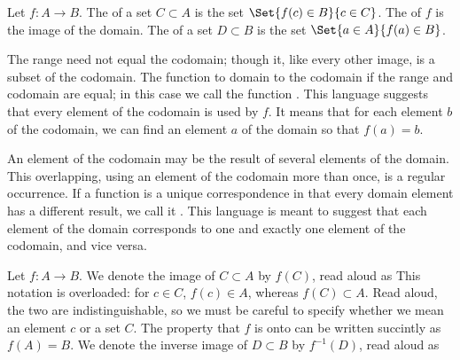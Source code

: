 Let $f: A \to B$.
The  of a set $C \subset A$
is the set $\Set{f(c) \in B}{c \in C}$.
The  of $f$ is the image
of the domain.
The  of a set
$D \subset B$ is the set $\Set{a \in A}{f(a) \in B}$.

The range need not equal the codomain; though it,
like every other image, is a subset of the codomain.
The function  to domain
 to the codomain if the
range and codomain are equal;
in this case we call the function .
This language suggests that every element of
the codomain is used by $f$.
It means that for each element $b$ of the codomain,
we can find an element $a$ of the domain so that
$f(a) = b$.

An element of the codomain may be the result
of several elements of the domain.
This overlapping, using an element of the
codomain more than once, is a regular occurrence.
If a function is a unique correspondence in that
every domain element has a different result,
we call it .
This language is meant to suggest that each
element of the domain corresponds to one and
exactly one element of the codomain, and vice versa.


Let $f: A \to B$.
We denote the image of $C \subset A$ by $f(C)$, read aloud as 
This notation is overloaded: for $c \in C$, $f(c) \in A$, whereas $f(C) \subset A$.
Read aloud, the two are indistinguishable, so we must be careful to specify whether we mean an element $c$ or a set $C$.
The property that $f$ is onto can be written succintly as $f(A) = B$.
We denote the inverse image of $D \subset B$ by $f^{-1}(D)$, read aloud as 


\strats
